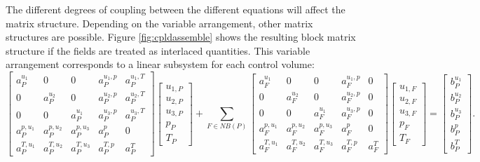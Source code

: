 The different degrees of coupling between the different equations will affect the matrix structure. Depending on the variable arrangement, other matrix structures are possible. Figure \ref{fig:cpldassemble} shows the resulting block matrix structure if the fields are treated as interlaced quantities. This variable arrangement corresponds to a linear subsystem for each control volume:
\begin{displaymath}
\left[
  \begin{array}{ccccc}
    a_P^{u_1}   & 0           & 0           & a_P^{u_1,p} & a_P^{u_1,T} \\[0.5em]
    0           & a_P^{u_2}   & 0           & a_P^{u_2,p} & a_P^{u_2,T} \\[0.5em]
    0           & 0           & a_P^{u_1}   & a_P^{u_3,p} & a_P^{u_3,T} \\[0.5em]
    a_P^{p,u_1} & a_P^{p,u_2} & a_P^{p,u_3} & a_P^{p}     & 0           \\[0.5em]
    a_P^{T,u_1} & a_P^{T,u_2} & a_P^{T,u_3} & a_P^{T,p}   & a_P^{T}
  \end{array}
\right]
\left[
\begin{array}{c}
  u_{1,P} \\[0.5em]
  u_{2,P} \\[0.5em]
  u_{3,P} \\[0.5em]
  p_{P  } \\[0.5em]
  T_{P}
\end{array}
\right]
+
\sum_{F \in NB(P)}
\left[
  \begin{array}{ccccc}
    a_F^{u_1}   & 0           & 0           & a_F^{u_1,p} & 0 \\[0.5em]
    0           & a_F^{u_2}   & 0           & a_F^{u_2,p} & 0 \\[0.5em]
    0           & 0           & a_F^{u_1}   & a_F^{u_3,p} & 0 \\[0.5em]
    a_F^{p,u_1} & a_F^{p,u_2} & a_F^{p,u_3} & a_F^{p}     & 0           \\[0.5em]
    a_F^{T,u_1} & a_F^{T,u_2} & a_F^{T,u_3} & a_F^{T,p}   & a_F^{T}
  \end{array}
\right]
\left[
\begin{array}{c}
  u_{1,F} \\[0.5em]
  u_{2,F} \\[0.5em]
  u_{3,F} \\[0.5em]
  p_{F  } \\[0.5em]
  T_{F}
\end{array}
\right]
=
\left[
\begin{array}{c}
  b_{P}^{u_1} \\[0.5em]
  b_{P}^{u_2} \\[0.5em]
  b_{P}^{u_3} \\[0.5em]
  b_{P}^{p}   \\[0.5em]
  b_{P}^{T}
\end{array}
\right].
\end{displaymath}
